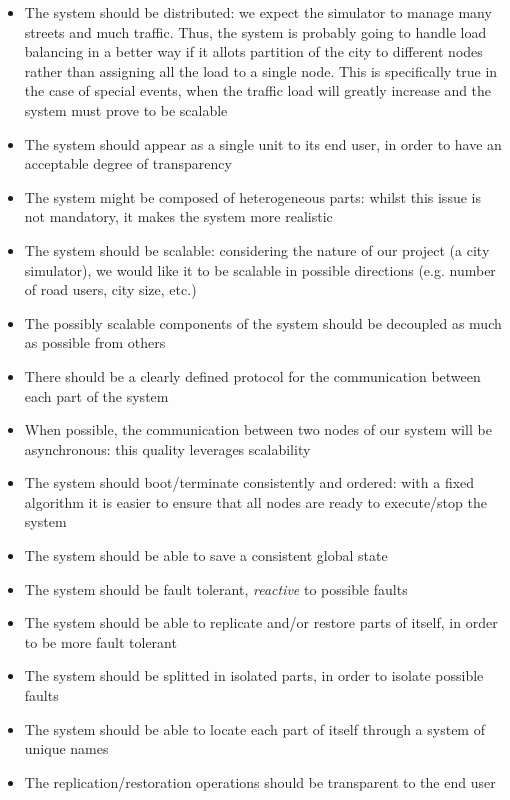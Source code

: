\begin{itemize}
\item The system should be distributed: we expect the simulator to manage many
  streets and much traffic. Thus, the system is probably going to handle load balancing
  in a better way if it allots partition of the city to different nodes rather than assigning
  all the load to a single node. This is specifically true in the case of special events,
  when the traffic load will greatly increase and the system must prove to be scalable
\item The system should appear as a single unit to its end user, in order to
  have an acceptable degree of transparency
\item The system might be composed of heterogeneous parts: whilst this issue
  is not mandatory, it makes the system more realistic
\item The system should be scalable: considering the nature of our project (a
  city simulator), we would like it to be scalable in possible directions
  (e.g. number of road users, city size, etc.)
\item The possibly scalable components of the system should be decoupled as much as possible from others
\item There should be a clearly defined protocol for the communication between
  each part of the system
\item When possible, the communication between two nodes of our system will be
  asynchronous: this quality leverages scalability
\item The system should boot/terminate consistently and ordered: with a fixed
  algorithm it is easier to ensure that all nodes are ready to execute/stop the
  system
\item The system should be able to save a consistent global state
\item The system should be fault tolerant, \emph{reactive} to possible faults
\item The system should be able to replicate and/or restore parts of itself,
  in order to be more fault tolerant
\item The system should be splitted in isolated parts, in order to isolate possible faults
\item The system should be able to locate each part of itself through a system
  of unique names
\item The replication/restoration operations should be transparent to the end user
\end{itemize}

